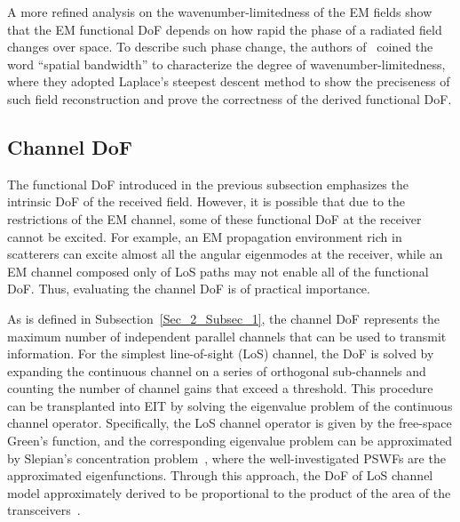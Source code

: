 \documentclass[journal,twocolumn]{IEEEtran}
\begin{document}
A more refined analysis on the wavenumber-limitedness of the EM fields show that the EM functional DoF depends on how rapid the phase of a radiated field changes over space. 
To describe such phase change, the authors of~\cite{bucci1987spatial} coined the word ``spatial bandwidth'' to characterize the degree of wavenumber-limitedness, where they adopted Laplace's steepest descent method to show the preciseness of such field reconstruction and prove the correctness of the derived functional DoF. 


\subsection{Channel DoF}
The functional DoF introduced in the previous subsection emphasizes the intrinsic DoF of the received field. 
However, it is possible that due to the restrictions of the EM channel, some of these functional DoF at the receiver cannot be excited. For example, an EM propagation environment rich in scatterers can excite almost all the angular eigenmodes at the receiver, while an EM channel composed only of LoS paths may not enable all of the functional DoF. Thus, evaluating the channel DoF is of practical importance.  

As is defined in Subsection~\ref{Sec_2_Subsec_1}, the channel DoF represents the maximum number of independent parallel channels that can be used to transmit information. 
For the simplest line-of-sight (LoS) channel, the DoF is solved by expanding the continuous channel on a series of orthogonal sub-channels and counting the number of channel gains that exceed a threshold. 
This procedure can be transplanted into EIT by solving the eigenvalue problem of the continuous channel operator. 
Specifically, the LoS channel operator is given by the free-space Green's function, and the corresponding eigenvalue problem can be approximated by Slepian's concentration problem~\cite{miller2000communicating}, where the well-investigated PSWFs are the approximated eigenfunctions.  
Through this approach, the DoF of LoS channel model approximately derived to be  proportional to the product of the area of the transceivers~\cite{pizzo2022nyquist,miller2000communicating}. 
\end{document}
